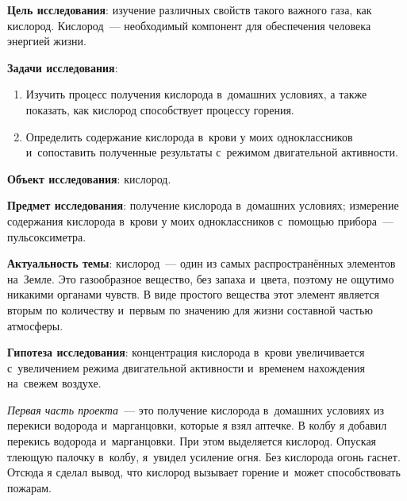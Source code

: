 \bigskip
{}



\makeProcTitleSchool


\textbf{Цель исследования}: изучение различных свойств такого важного газа, как кислород. Кислород~--- необходимый компонент для обеспечения человека энергией жизни.

\textbf{Задачи исследования}:
\begin{enumerate}[noitemsep]\vspace{-8pt}
\item Изучить процесс получения кислорода в~домашних условиях, а также показать, как кислород способствует процессу горения.
\item Определить содержание кислорода в~крови у моих одноклассников и~сопоставить полученные результаты с~режимом двигательной активности.
\end{enumerate}\vspace{-8pt}

\textbf{Объект исследования}: кислород.

\textbf{Предмет исследования}: получение кислорода в~домашних условиях; измерение содержания кислорода в~крови у моих одноклассников с~помощью прибора~--- пульсоксиметра.

\textbf{Актуальность темы}: кислород~--- один из самых распространённых элементов на~Земле. Это газообразное вещество, без запаха и~цвета, поэтому не ощутимо никакими органами чувств. В виде простого вещества этот элемент является вторым по количеству и~первым по значению для жизни составной частью атмосферы.

\textbf{Гипотеза исследования}: концентрация кислорода в~крови увеличивается с~увеличением режима двигательной активности и~временем нахождения на~свежем воздухе.

\textit{Первая часть проекта}~--- это получение кислорода в~домашних условиях из перекиси водорода и~марганцовки, которые я взял аптечке. В колбу я добавил перекись водорода и~марганцовки. При этом выделяется кислород. Опуская тлеющую палочку в~колбу, я~увидел усиление огня. Без кислорода огонь гаснет. Отсюда я сделал вывод, что кислород вызывает горение и~может способствовать пожарам.

